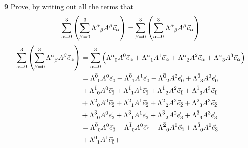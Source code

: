 \documentclass[gr-notes.tex]{subfiles}
\begin{document}
\textbf{9}
Prove, by writing out all the terms that
%
\begin{displaymath}
  \sum_{\bar\alpha = 0}^3 \qty(
    \sum_{\beta = 0}^3
      \tensor{\Lambda}{^{\bar\alpha}_\beta}
      \tensor{A}{^\beta}
      \vec{e}_{\bar\alpha}
  ) =
  \sum_{\beta = 0}^3 \qty(
    \sum_{\bar\alpha = 0}^3
      \tensor{\Lambda}{^{\bar\alpha}_\beta}
      \tensor{A}{^\beta}
      \vec{e}_{\bar\alpha}
  )
\end{displaymath}
%
\begin{align*}
  \sum_{\bar\alpha = 0}^3 \qty(
    \sum_{\beta = 0}^3
      \tensor{\Lambda}{^{\bar\alpha}_\beta}
      \tensor{A}{^\beta}
      \vec{e}_{\bar\alpha}
  ) &=
  \sum_{\bar\alpha = 0}^3 \qty(
    \tensor{\Lambda}{^{\bar\alpha}_0} \tensor{A}{^0} \vec{e}_{\bar\alpha} +
    \tensor{\Lambda}{^{\bar\alpha}_1} \tensor{A}{^1} \vec{e}_{\bar\alpha} +
    \tensor{\Lambda}{^{\bar\alpha}_2} \tensor{A}{^2} \vec{e}_{\bar\alpha} +
    \tensor{\Lambda}{^{\bar\alpha}_3} \tensor{A}{^3} \vec{e}_{\bar\alpha}
  )
  \\ &=
  \tensor{\Lambda}{^{\bar0}_0} \tensor{A}{^0} \vec{e}_{\bar0} +
  \tensor{\Lambda}{^{\bar0}_1} \tensor{A}{^1} \vec{e}_{\bar0} +
  \tensor{\Lambda}{^{\bar0}_2} \tensor{A}{^2} \vec{e}_{\bar0} +
  \tensor{\Lambda}{^{\bar0}_3} \tensor{A}{^3} \vec{e}_{\bar0}
  \\ &+
  \tensor{\Lambda}{^{\bar1}_0} \tensor{A}{^0} \vec{e}_{\bar1} +
  \tensor{\Lambda}{^{\bar1}_1} \tensor{A}{^1} \vec{e}_{\bar1} +
  \tensor{\Lambda}{^{\bar1}_2} \tensor{A}{^2} \vec{e}_{\bar1} +
  \tensor{\Lambda}{^{\bar1}_3} \tensor{A}{^3} \vec{e}_{\bar1}
  \\ &+
  \tensor{\Lambda}{^{\bar2}_0} \tensor{A}{^0} \vec{e}_{\bar2} +
  \tensor{\Lambda}{^{\bar2}_1} \tensor{A}{^1} \vec{e}_{\bar2} +
  \tensor{\Lambda}{^{\bar2}_2} \tensor{A}{^2} \vec{e}_{\bar2} +
  \tensor{\Lambda}{^{\bar2}_3} \tensor{A}{^3} \vec{e}_{\bar2}
  \\ &+
  \tensor{\Lambda}{^{\bar3}_0} \tensor{A}{^0} \vec{e}_{\bar3} +
  \tensor{\Lambda}{^{\bar3}_1} \tensor{A}{^1} \vec{e}_{\bar3} +
  \tensor{\Lambda}{^{\bar3}_2} \tensor{A}{^2} \vec{e}_{\bar3} +
  \tensor{\Lambda}{^{\bar3}_3} \tensor{A}{^3} \vec{e}_{\bar3}
  \\ &=
  \tensor{\Lambda}{^{\bar0}_0} \tensor{A}{^0} \vec{e}_{\bar0} +
  \tensor{\Lambda}{^{\bar1}_0} \tensor{A}{^0} \vec{e}_{\bar1} +
  \tensor{\Lambda}{^{\bar2}_0} \tensor{A}{^0} \vec{e}_{\bar2} +
  \tensor{\Lambda}{^{\bar3}_0} \tensor{A}{^0} \vec{e}_{\bar3}
  \\ &+
  \tensor{\Lambda}{^{\bar0}_1} \tensor{A}{^1} \vec{e}_{\bar0} +

\end{align*}
\end{document}
